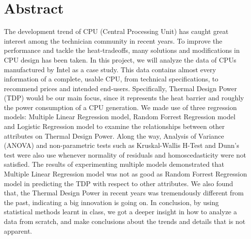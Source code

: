 %
%
%   
\section{Abstract}

The development trend of CPU (Central Processing Unit) has caught great interest among the technician
community in recent years. To improve the performance and tackle the heat-tradeoffs, many solutions
and modifications in CPU design has been taken. In this project, we will analyze the data of CPUs
manufactured by Intel as a case study. This data contains almost every information of a complete, usable
CPU, from technical specifications, to recommend prices and intended end-users. Specifically, Thermal Design Power (TDP)
would be our main focus, since it represents the heat barrier and roughly the power consumption of a CPU generation.
We made use of three regression models: Multiple Linear Regression model, Random Forrest Regression model and Logistic Regression
model to examine the relationships between other attributes on Thermal Design Power. Along the way, Analysis of Variance (ANOVA) and
non-parametric tests such as Kruskal-Wallis H-Test and Dunn's test were also use whenever normality of residuals and homoscedasticity
were not satisfied. The results of experimenting multiple models demonstrated that Multiple Linear Regression model was not as good as 
Random Forrest Regression model in predicting the TDP with respect to other attributes. We also found that, the Thermal Design Power in
recent years was tremendously different from the past, indicating a big innovation is going on. In conclusion, by using statistical methods
learnt in class, we got a deeper insight in how to analyze a data from scratch, and make conclusions about the trends and details that is
not apparent.